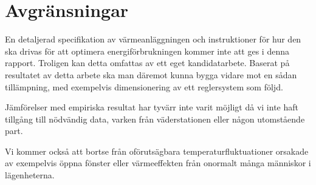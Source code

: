 \section{Avgränsningar}

En detaljerad specifikation av värmeanläggningen och instruktioner för hur den ska drivas för att optimera energiförbrukningen kommer inte att ges i denna rapport. Troligen kan detta omfattas av ett eget kandidatarbete. Baserat på resultatet av detta arbete ska man däremot kunna bygga vidare mot en sådan tillämpning, med exempelvis dimensionering av ett reglersystem som följd.

Jämförelser med empiriska resultat har tyvärr inte varit möjligt då vi inte haft tillgång till nödvändig data, varken från väderstationen eller någon utomstående part.

Vi kommer också att bortse från oförutsägbara temperaturfluktuationer orsakade av exempelvis öppna fönster eller värmeeffekten från onormalt många människor i lägenheterna.
